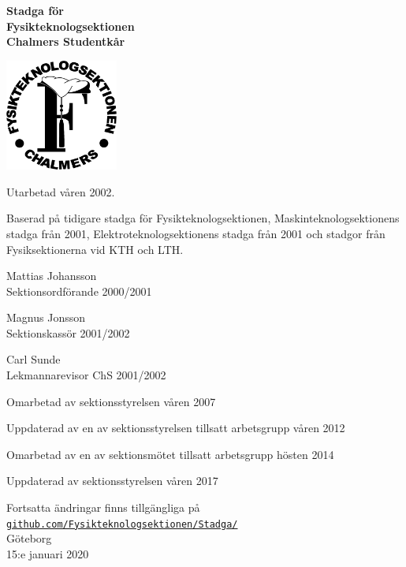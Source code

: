 \documentclass[11pt,a4paper]{article}
\begin{document}

\setlength{\headheight}{14pt}
\begin{center}
  \textbf{\Huge{Stadga för}}\\[3mm]
  \textbf{\Huge{Fysikteknologsektionen}}\\
  \vspace{.7 cm}
  \textbf{\Large{Chalmers Studentkår}}

  \vspace{1.25em}
  \includegraphics[width=10em]{sektionslogo.eps}
  \vspace{1.25em}

  Utarbetad våren 2002.
  
  Baserad på tidigare stadga för Fysikteknologsektionen, Maskinteknologsektionens stadga från 2001, Elektroteknologsektionens stadga från 2001 och stadgor från Fysiksektionerna vid KTH och LTH\@.
  
  Mattias Johansson\\
  Sektionsordförande 2000/2001

  Magnus Jonsson\\
  Sektionskassör 2001/2002

  Carl Sunde\\
  Lekmannarevisor ChS 2001/2002
  
  Omarbetad av sektionsstyrelsen våren 2007
  
  Uppdaterad av en av sektionsstyrelsen tillsatt arbetsgrupp våren 2012

  Omarbetad av en av sektionsmötet tillsatt arbetsgrupp hösten 2014
  
  Uppdaterad av sektionsstyrelsen våren 2017

  Fortsatta ändringar finns tillgängliga på\\
  \href{https://github.com/Fysikteknologsektionen/Stadga/commits/master}{\texttt{github.com/Fysikteknologsektionen/Stadga/}}\\[5mm]

  \small{Göteborg}\\
  \small{15:e januari 2020}
\end{center}
\end{document}

